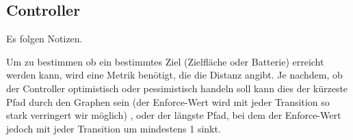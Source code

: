 \subsection{Controller}
Es folgen Notizen.

Um zu bestimmen ob ein bestimmtes Ziel (Zielfläche oder Batterie) erreicht werden kann, wird eine Metrik benötigt,
die die Distanz angibt. Je nachdem, ob der Controller optimistisch oder pessimistisch handeln soll kann dies der kürzeste
Pfad durch den Graphen sein (der Enforce-Wert wird mit jeder Transition so stark verringert wir möglich)
, oder der längste Pfad, bei dem der Enforce-Wert jedoch mit jeder Transition um mindestens 1 sinkt.